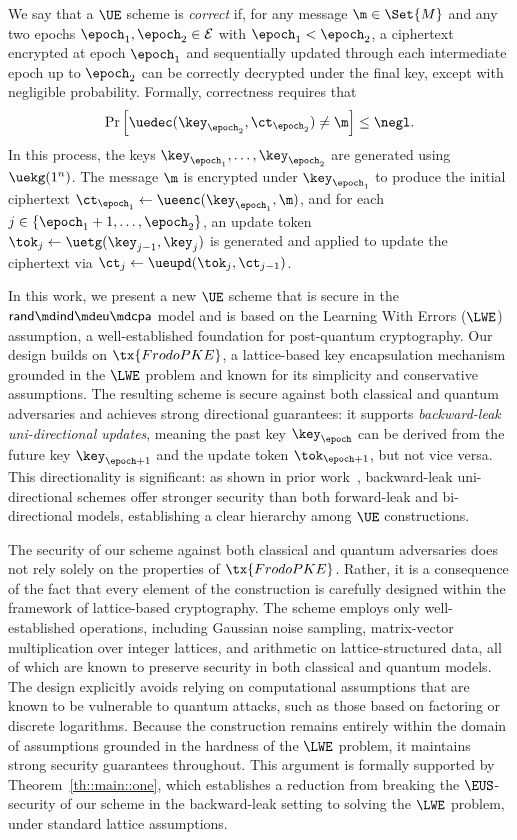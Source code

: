 \documentclass{fundam}
\begin{document}
We say that a $\UE$ scheme is \emph{correct} if, for any message $\m \in \Set{M}$ and any two epochs $\epoch_1, \epoch_2 \in \mathcal{E}$ with $\epoch_1 < \epoch_2$, a ciphertext encrypted at epoch $\epoch_1$ and sequentially updated through each intermediate epoch up to $\epoch_2$ can be correctly decrypted under the final key, except with negligible probability. Formally, correctness requires that
\[
\Pr\left[ \uedec(\key_{\epoch_2}, \ct_{\epoch_2}) \neq \m \right] \leq \negl.
\]
In this process, the keys $\key_{\epoch_1}, \ldots, \key_{\epoch_2}$ are generated using $\uekg(1^n)$. The message $\m$ is encrypted under $\key_{\epoch_1}$ to produce the initial ciphertext $\ct_{\epoch_1} \gets \ueenc(\key_{\epoch_1}, \m)$, and for each $j \in \{\epoch_1 + 1, \ldots, \epoch_2\}$, an update token $\tok_j \gets \uetg(\key_{j-1}, \key_j)$ is generated and applied to update the ciphertext via $\ct_j \gets \ueupd(\tok_j, \ct_{j-1})$.


In this work, we present a new $\UE$ scheme that is secure in the $\mathsf{rand}\md\mathsf{ind}\md\mathsf{eu}\md\mathsf{cpa}$ model and is based on the Learning With Errors ($\LWE$) assumption, a well-established foundation for post-quantum cryptography. Our design builds on $\tx{FrodoPKE}$, a lattice-based key encapsulation mechanism grounded in the $\LWE$ problem and known for its simplicity and conservative assumptions. The resulting scheme is secure against both classical and quantum adversaries and achieves strong directional guarantees: it supports \emph{backward-leak uni-directional updates}, meaning the past key $\key_{\epoch}$ can be derived from the future key $\key_{\epoch+1}$ and the update token $\tok_{\epoch+1}$, but not vice versa. This directionality is significant: as shown in prior work~\cite{nishimaki2022direction}, backward-leak uni-directional schemes offer stronger security than both forward-leak and bi-directional models, establishing a clear hierarchy among $\UE$ constructions.


The security of our scheme against both classical and quantum adversaries does not rely solely on the properties of $\tx{FrodoPKE}$. Rather, it is a consequence of the fact that every element of the construction is carefully designed within the framework of lattice-based cryptography. The scheme employs only well-established operations, including Gaussian noise sampling, matrix-vector multiplication over integer lattices, and arithmetic on lattice-structured data, all of which are known to preserve security in both classical and quantum models. The design explicitly avoids relying on computational assumptions that are known to be vulnerable to quantum attacks, such as those based on factoring or discrete logarithms. Because the construction remains entirely within the domain of assumptions grounded in the hardness of the $\LWE$ problem, it maintains strong security guarantees throughout. This argument is formally supported by Theorem~\ref{th::main::one}, which establishes a reduction from breaking the $\EUS$-security of our scheme in the backward-leak setting to solving the $\LWE$ problem, under standard lattice assumptions.
\end{document}
